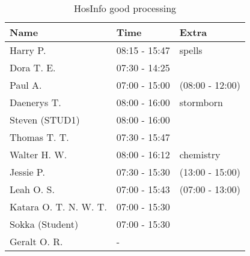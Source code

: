 \begin{table}[H]
    \centering
    \begin{tabular}{|l|l|l|}
        \hline
        \textbf{Name}         & \textbf{Time} & \textbf{Extra}  \\ \hline
        Harry P.              & 08:15 - 15:47 & spells          \\ \hline
        Dora T. E.            & 07:30 - 14:25 &                 \\ \hline
        Paul A.               & 07:00 - 15:00 & (08:00 - 12:00)          \\ \hline
        Daenerys T.           & 08:00 - 16:00 & stormborn       \\ \hline
        Steven (STUD1)        & 08:00 - 16:00 &                 \\ \hline
        Thomas T. T.          & 07:30 - 15:47 &                 \\ \hline
        Walter H. W.          & 08:00 - 16:12 & chemistry       \\ \hline
        Jessie P.             & 07:30 - 15:30 & (13:00 - 15:00)         \\ \hline
        Leah O. S.            & 07:00 - 15:43 & (07:00 - 13:00) \\ \hline
        Katara O. T. N. W. T. & 07:00 - 15:30 &                 \\ \hline
        Sokka (Student)       & 07:00 - 15:30 &                 \\ \hline
        Geralt O. R.          & -             &                 \\ \hline
    \end{tabular}
    \caption{HosInfo good processing}
    \label{tab:HosInfo-good-processing}
\end{table}

